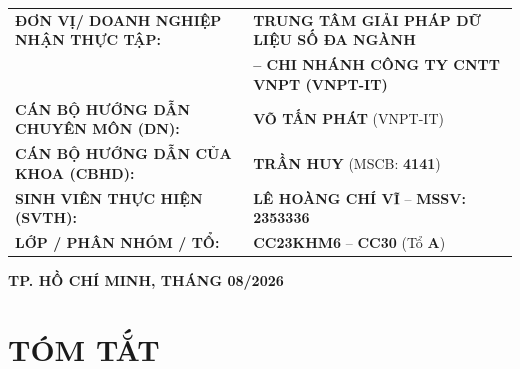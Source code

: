 \documentclass[12pt,a4paper]{report}
\begin{document}
\begin{titlepage}
\vspace{0.35cm}
\begin{flushleft}
\fontsize{10.5}{13.5}\selectfont
\hspace{0.2cm}
\begin{tabular}{p{6.4cm}l}
  \textbf{ĐƠN VỊ/ DOANH NGHIỆP NHẬN THỰC TẬP:} & \textbf{TRUNG TÂM GIẢI PHÁP DỮ LIỆU SỐ ĐA NGÀNH} \\
  & \textbf{-- CHI NHÁNH CÔNG TY CNTT VNPT (VNPT-IT)} \\[0.08cm]
  \textbf{CÁN BỘ HƯỚNG DẪN CHUYÊN MÔN (DN):} & \textbf{VÕ TẤN PHÁT} (VNPT-IT) \\[0.08cm]
  \textbf{CÁN BỘ HƯỚNG DẪN CỦA KHOA (CBHD):} & \textbf{TRẦN HUY} (MSCB: \textbf{4141}) \\[0.08cm]
  \textbf{SINH VIÊN THỰC HIỆN (SVTH):} & \textbf{LÊ HOÀNG CHÍ VĨ} -- \textbf{MSSV: 2353336} \\[0.08cm]
  \textbf{LỚP / PHÂN NHÓM / TỔ:} & \textbf{CC23KHM6} -- \textbf{CC30} (Tổ \textbf{A}) \\
\end{tabular}
\end{flushleft}

\vfill
{\fontsize{11}{14}\selectfont\bfseries TP. HỒ CHÍ MINH, THÁNG 08/2026}
\vspace{0.1cm}
\restoregeometry
\end{titlepage}

\newpage


\newpage
\chapter*{TÓM TẮT}


\newpage
\tableofcontents

\newpage
\listoffigures
{}

\newpage
\listoftables
{}
\end{document}

